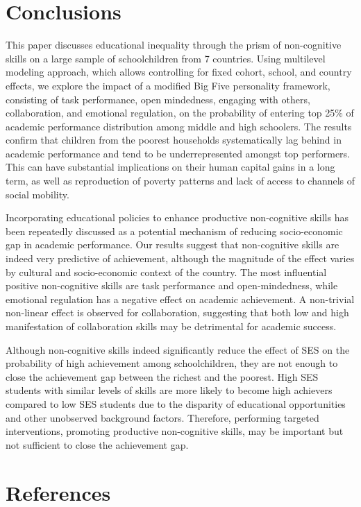 \documentclass{article}
\begin{document}
\hypertarget{conclusions}{%
\section{Conclusions}\label{conclusions}}

This paper discusses educational inequality through the prism of
non-cognitive skills on a large sample of schoolchildren from 7
countries. Using multilevel modeling approach, which allows controlling
for fixed cohort, school, and country effects, we explore the impact of
a modified Big Five personality framework, consisting of task
performance, open mindedness, engaging with others, collaboration, and
emotional regulation, on the probability of entering top 25\% of
academic performance distribution among middle and high schoolers. The
results confirm that children from the poorest households systematically
lag behind in academic performance and tend to be underrepresented
amongst top performers. This can have substantial implications on their
human capital gains in a long term, as well as reproduction of poverty
patterns and lack of access to channels of social mobility.

Incorporating educational policies to enhance productive non-cognitive
skills has been repeatedly discussed as a potential mechanism of
reducing socio-economic gap in academic performance. Our results suggest
that non-cognitive skills are indeed very predictive of achievement,
although the magnitude of the effect varies by cultural and
socio-economic context of the country. The most influential positive
non-cognitive skills are task performance and open-mindedness, while
emotional regulation has a negative effect on academic achievement. A
non-trivial non-linear effect is observed for collaboration, suggesting
that both low and high manifestation of collaboration skills may be
detrimental for academic success.

Although non-cognitive skills indeed significantly reduce the effect of
SES on the probability of high achievement among schoolchildren, they
are not enough to close the achievement gap between the richest and the
poorest. High SES students with similar levels of skills are more likely
to become high achievers compared to low SES students due to the
disparity of educational opportunities and other unobserved background
factors. Therefore, performing targeted interventions, promoting
productive non-cognitive skills, may be important but not sufficient to
close the achievement gap.

\hypertarget{references}{%
\section*{References}\label{references}}
\end{document}
